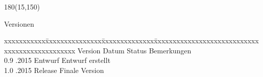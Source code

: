 \begin{textblock}{180}(15,150)
\color{black}
\begin{huge}
Versionen
\end{huge}
\vspace{10mm}

\fontsize{10pt}{18pt}\selectfont
\begin{tabbing}
xxxxxxxxxxx\=xxxxxxxxxxxxxxx\=xxxxxxxxxxxxxx\=xxxxxxxxxxxxxxxxxxxxxxxxxxxxxxxxxxxxxxxxxxxxxxx \kill
Version	\> Datum	\> Status		\> Bemerkungen		\\
0.9	.2015	\> Entwurf		\> Entwurf erstellt	\\	
1.0	.2015	\> Release		\> Finale Version	\\	
\end{tabbing}

\end{textblock}
